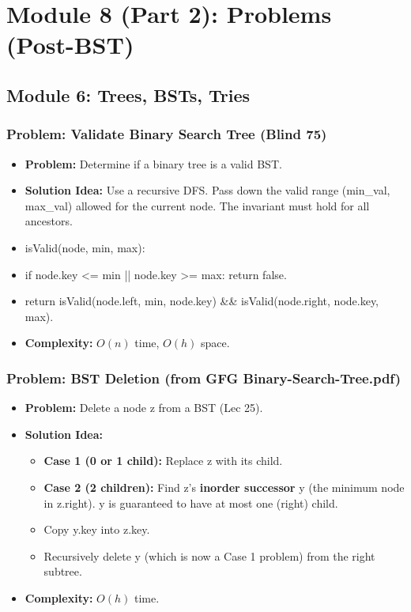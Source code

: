 
\section{Module 8 (Part 2): Problems (Post-BST)}

\subsection{Module 6: Trees, BSTs, Tries}

\subsubsection{Problem: Validate Binary Search Tree (Blind 75)}
\begin{itemize}
\item \textbf{Problem:} Determine if a binary tree is a valid BST.
\item \textbf{Solution Idea:} Use a recursive DFS. Pass down the valid range (min\_val, max\_val) allowed for the current node. The invariant must hold for all ancestors.
\item isValid(node, min, max):
\item if node.key <= min || node.key >= max: return false.
\item return isValid(node.left, min, node.key) \&\& isValid(node.right, node.key, max).
\item \textbf{Complexity:} $O(n)$ time, $O(h)$ space.
\end{itemize}

\subsubsection{Problem: BST Deletion (from GFG Binary-Search-Tree.pdf)}
\begin{itemize}
\item \textbf{Problem:} Delete a node z from a BST (Lec 25).
\item \textbf{Solution Idea:}
\begin{itemize}
\item \textbf{Case 1 (0 or 1 child):} Replace z with its child.
\item \textbf{Case 2 (2 children):} Find z's \textbf{inorder successor} y (the minimum node in z.right). y is guaranteed to have at most one (right) child.
\item Copy y.key into z.key.
\item Recursively delete y (which is now a Case 1 problem) from the right subtree.
\end{itemize}
\item \textbf{Complexity:} $O(h)$ time.
\end{itemize}

